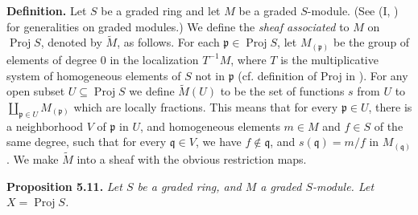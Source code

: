 {\medskip
\noindent\textbf{Definition.} Let $S$ be a graded ring and let $M$ be a graded $S$-module. (See (I, ) for generalities on graded modules.) We define the \emph{sheaf associated} to $M$ on $\operatorname{Proj}S$, denoted by $\widetilde M$, as follows. For each $\mathfrak p\in\operatorname{Proj}S$, let $M_{(\mathfrak p)}$ be the group of elements of degree $0$ in the localization $T^{-1}M$, where $T$ is the multiplicative system of homogeneous elements of $S$ not in $\mathfrak p$ (cf. definition of Proj in ). For any open subset $U\subseteq\operatorname{Proj}S$ we define $\widetilde M(U)$ to be the set of functions $s$ from $U$ to $\coprod_{\mathfrak p\in U}M_{(\mathfrak p)}$ which are locally fractions. This means that for every $\mathfrak p\in U$, there is a neighborhood $V$ of $\mathfrak p$ in $U$, and homogeneous elements $m\in M$ and $f\in S$ of the same degree, such that for every $\mathfrak q\in V$, we have $f\notin\mathfrak q$, and $s(\mathfrak q)=m/f$ in $M_{(\mathfrak q)}$. We make $\widetilde M$ into a sheaf with the obvious restriction maps.

\medskip
\noindent\hypertarget{result-II-5.11}{}\textbf{Proposition 5.11.} \emph{Let $S$ be a graded ring, and $M$ a graded $S$-module. Let $X=\operatorname{Proj}S$.}
}
